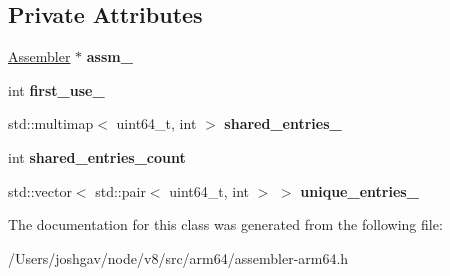 \subsection*{Private Attributes}
\begin{DoxyCompactItemize}
\item 
\hyperlink{classv8_1_1internal_1_1_assembler}{Assembler} $\ast$ {\bfseries assm\+\_\+}\hypertarget{classv8_1_1internal_1_1_const_pool_a41deca963c52db7a2eaf2c1716606e99}{}\label{classv8_1_1internal_1_1_const_pool_a41deca963c52db7a2eaf2c1716606e99}

\item 
int {\bfseries first\+\_\+use\+\_\+}\hypertarget{classv8_1_1internal_1_1_const_pool_aac993b9aa64325146d7e579d46a16c54}{}\label{classv8_1_1internal_1_1_const_pool_aac993b9aa64325146d7e579d46a16c54}

\item 
std\+::multimap$<$ uint64\+\_\+t, int $>$ {\bfseries shared\+\_\+entries\+\_\+}\hypertarget{classv8_1_1internal_1_1_const_pool_a4a259eddfd3ac7aac89451f524485092}{}\label{classv8_1_1internal_1_1_const_pool_a4a259eddfd3ac7aac89451f524485092}

\item 
int {\bfseries shared\+\_\+entries\+\_\+count}\hypertarget{classv8_1_1internal_1_1_const_pool_a375e28096085f82aafb08471afeb8352}{}\label{classv8_1_1internal_1_1_const_pool_a375e28096085f82aafb08471afeb8352}

\item 
std\+::vector$<$ std\+::pair$<$ uint64\+\_\+t, int $>$ $>$ {\bfseries unique\+\_\+entries\+\_\+}\hypertarget{classv8_1_1internal_1_1_const_pool_abe2e1e9e5ece511c499f78d3b7f448ab}{}\label{classv8_1_1internal_1_1_const_pool_abe2e1e9e5ece511c499f78d3b7f448ab}

\end{DoxyCompactItemize}


The documentation for this class was generated from the following file\+:\begin{DoxyCompactItemize}
\item 
/\+Users/joshgav/node/v8/src/arm64/assembler-\/arm64.\+h\end{DoxyCompactItemize}
